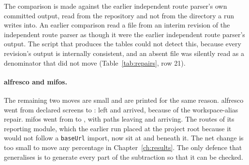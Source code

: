 The comparison is made against the earlier independent route parser's own committed output, read from the repository and not from the directory a run writes into. An earlier comparison read a file from an interim revision of the independent route parser as though it were the earlier independent route parser's output. The script that produces the tables could not detect this, because every revision's output is internally consistent, and an absent file was silently read as a denominator that did not move (Table~\ref{tab:repairs}, row 21).

\paragraph{alfresco and mifos.} The remaining two moves are small and are printed for the same reason. alfresco went from \RoundTwoEarlierOracleAlfrescoDeclared{} declared screens to \RoundTwoEarlierOracleAlfrescoNow{}: \RoundTwoEarlierOracleAlfrescoInside{} left and \RoundTwoEarlierOracleAlfrescoAdded{} arrived, because of the workspace-alias repair. mifos went from \RoundTwoEarlierOracleMifosDeclared{} to \RoundTwoEarlierOracleMifosNow{}, with \RoundTwoEarlierOracleMifosInside{} paths leaving and \RoundTwoEarlierOracleMifosAdded{} arriving. The routes of its reporting module, which the earlier run placed at the project root because it would not follow a \texttt{baseUrl} import, now sit at  and beneath it. The net change is too small to move any percentage in Chapter~\ref{ch:results}. The only defence that generalises is to generate every part of the subtraction so that it can be checked.

